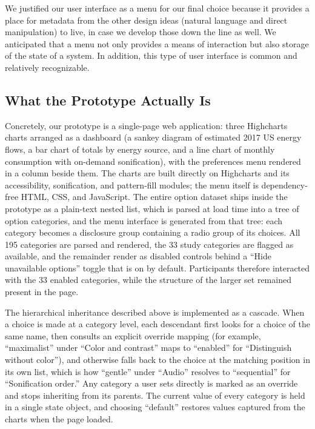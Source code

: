 \documentclass[12pt]{cmuthesis}
\begin{document}
We justified our user interface as a menu for our final choice because it provides a place for metadata from the other design ideas (natural language and direct manipulation) to live, in case we develop those down the line as well. We anticipated that a menu not only provides a means of interaction but also storage of the state of a system. In addition, this type of user interface is common and relatively recognizable.

\subsection{What the Prototype Actually Is}
Concretely, our prototype is a single-page web application: three Highcharts charts arranged as a dashboard (a sankey diagram of estimated 2017 US energy flows, a bar chart of totals by energy source, and a line chart of monthly consumption with on-demand sonification), with the preferences menu rendered in a column beside them. The charts are built directly on Highcharts and its accessibility, sonification, and pattern-fill modules; the menu itself is dependency-free HTML, CSS, and JavaScript. The entire option dataset ships inside the prototype as a plain-text nested list, which is parsed at load time into a tree of option categories, and the menu interface is generated from that tree: each category becomes a disclosure group containing a radio group of its choices. All 195 categories are parsed and rendered, the 33 study categories are flagged as available, and the remainder render as disabled controls behind a ``Hide unavailable options'' toggle that is on by default. Participants therefore interacted with the 33 enabled categories, while the structure of the larger set remained present in the page.

The hierarchical inheritance described above is implemented as a cascade. When a choice is made at a category level, each descendant first looks for a choice of the same name, then consults an explicit override mapping (for example, ``maximalist'' under ``Color and contrast'' maps to ``enabled'' for ``Distinguish without color''), and otherwise falls back to the choice at the matching position in its own list, which is how ``gentle'' under ``Audio'' resolves to ``sequential'' for ``Sonification order.'' Any category a user sets directly is marked as an override and stops inheriting from its parents. The current value of every category is held in a single state object, and choosing ``default'' restores values captured from the charts when the page loaded.
\end{document}
